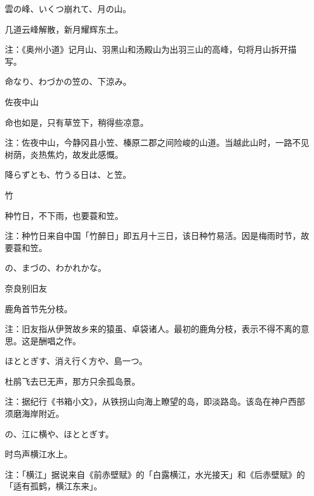\begin{haiku}
    {\FH 雲の峰、いくつ崩れて、月の山。}

    {\FK 几道云峰解散，新月耀辉东土。}

    {\FT 注：《奥州小道》记月山、羽黑山和汤殿山为出羽三山的高峰，句将月山拆开描写。}
\end{haiku}

\begin{haiku}
    {\FH 命なり、わづかの笠の、下涼み。}

    {\FK 佐夜中山}

    {\FK 命也如是，只有草笠下，稍得些凉意。}

    {\FT 注：佐夜中山，今静冈县小笠、榛原二郡之间险峻的山道。当越此山时，一路不见树荫，炎热焦灼，故发此感慨。}
\end{haiku}

\begin{haiku}
    {\FH 降らずとも、竹うる日は、と笠。}

    {\FK 竹}

    {\FK 种竹日，不下雨，也要蓑和笠。}

    {\FT 注：种竹日来自中国「竹醉日」即五月十三日，该日种竹易活。因是梅雨时节，故要蓑和笠。}
\end{haiku}

\begin{haiku}
    {\FH {}の、まづの、わかれかな。}

    {\FK 奈良别旧友}

    {\FK 鹿角首节先分枝。}

    {\FT 注：旧友指从伊贺故乡来的猿虽、卓袋诸人。最初的鹿角分枝，表示不得不离的意思。这是酬唱之作。}
\end{haiku}

\begin{haiku}
    {\FH ほととぎす、消え行く方や、島一つ。}

    {\FK 杜鹃飞去已无声，那方只余孤岛景。}

    {\FT 注：据纪行《书箱小文》，从铁拐山向海上瞭望的岛，即淡路岛。该岛在神户西部须磨海岸附近。}
\end{haiku}

\begin{haiku}
    {\FH {}の、江に横や、ほととぎす。}

    {\FK 时鸟声横江水上。}

    {\FT 注：「横江」据说来自《前赤壁赋》的「白露横江，水光接天」和《后赤壁赋》的「适有孤鹤，横江东来」。}
\end{haiku}

